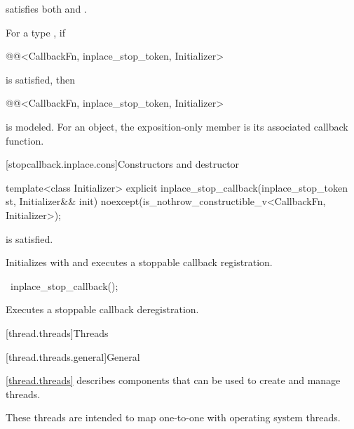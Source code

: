 \pnum
\mandates
{} satisfies both
 and .

\pnum
\remarks
For a type , if
\begin{codeblock}
@@<CallbackFn, inplace_stop_token, Initializer>
\end{codeblock}
is satisfied, then
\begin{codeblock}
@@<CallbackFn, inplace_stop_token, Initializer>
\end{codeblock}
is modeled.
For an  object,
the exposition-only  member is
its associated callback function.

[stopcallback.inplace.cons]{Constructors and destructor}

%
\begin{itemdecl}
template<class Initializer>
  explicit inplace_stop_callback(inplace_stop_token st, Initializer&& init)
    noexcept(is_nothrow_constructible_v<CallbackFn, Initializer>);
\end{itemdecl}

\begin{itemdescr}
\pnum
\constraints
{} is satisfied.

\pnum
\effects
Initializes  with 
and executes a stoppable callback registration.
\end{itemdescr}

%
\begin{itemdecl}
~inplace_stop_callback();
\end{itemdecl}

\begin{itemdescr}
\pnum
\effects
Executes a stoppable callback deregistration.
\end{itemdescr}

[thread.threads]{Threads}

[thread.threads.general]{General}

\pnum
\ref{thread.threads} describes components that can be used to create and manage threads.
\begin{note}
These threads are intended to map one-to-one with operating system threads.
\end{note}

